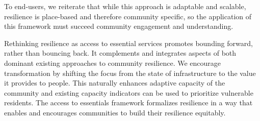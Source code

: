 \documentclass[9pt,twocolumn,twoside,lineno]{pnas-new}
\begin{document}
To end-users, we reiterate that while this approach is adaptable and scalable, resilience is place-based and therefore community specific, so the application of this framework must succeed community engagement and understanding.

Rethinking resilience as access to essential services promotes bounding forward, rather than bouncing back. It complements and integrates aspects of both dominant existing approaches to community resilience. We encourage transformation by shifting the focus from the state of infrastructure to the value it provides to people. This naturally enhances adaptive capacity of the community and existing capacity indicators can be used to prioritize vulnerable residents. The access to essentials framework formalizes resilience in a way that enables and encourages communities to build their resilience equitably. 




\showacknow{} %


\end{document}
